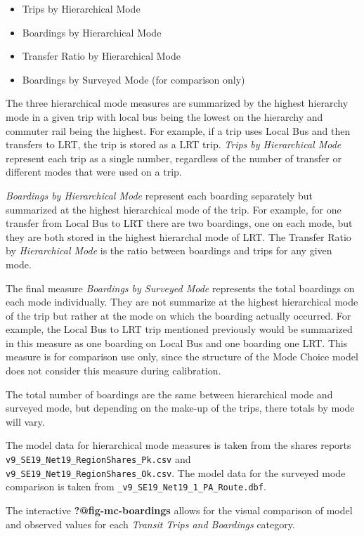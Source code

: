 \documentclass[
  letterpaper,
  DIV=11,
  numbers=noendperiod]{scrreprt}
\providecommand{\tightlist}{%
  \setlength{\itemsep}{0pt}\setlength{\parskip}{0pt}}\usepackage{longtable,booktabs,array}
\begin{document}
\begin{itemize}
\tightlist
\item
  Trips by Hierarchical Mode
\item
  Boardings by Hierarchical Mode
\item
  Transfer Ratio by Hierarchical Mode
\item
  Boardings by Surveyed Mode (for comparison only)
\end{itemize}

The three hierarchical mode measures are summarized by the highest
hierarchy mode in a given trip with local bus being the lowest on the
hierarchy and commuter rail being the highest. For example, if a trip
uses Local Bus and then transfers to LRT, the trip is stored as a LRT
trip. \emph{Trips by Hierarchical Mode} represent each trip as a single
number, regardless of the number of transfer or different modes that
were used on a trip.

\emph{Boardings by Hierarchical Mode} represent each boarding separately
but summarized at the highest hierarchical mode of the trip. For
example, for one transfer from Local Bus to LRT there are two boardings,
one on each mode, but they are both stored in the highest hierarchal
mode of LRT. The Transfer Ratio by \emph{Hierarchical Mode} is the ratio
between boardings and trips for any given mode.

The final measure \emph{Boardings by Surveyed Mode} represents the total
boardings on each mode individually. They are not summarize at the
highest hierarchical mode of the trip but rather at the mode on which
the boarding actually occurred. For example, the Local Bus to LRT trip
mentioned previously would be summarized in this measure as one boarding
on Local Bus and one boarding one LRT. This measure is for comparison
use only, since the structure of the Mode Choice model does not consider
this measure during calibration.

The total number of boardings are the same between hierarchical mode and
surveyed mode, but depending on the make-up of the trips, there totals
by mode will vary.

The model data for hierarchical mode measures is taken from the shares
reports \texttt{v9\_SE19\_Net19\_RegionShares\_Pk.csv} and
\texttt{v9\_SE19\_Net19\_RegionShares\_Ok.csv}. The model data for the
surveyed mode comparison is taken from
\texttt{\_v9\_SE19\_Net19\_1\_PA\_Route.dbf}.

The interactive \textbf{?@fig-mc-boardings} allows for the visual
comparison of model and observed values for each \emph{Transit Trips and
Boardings} category.
\end{document}
